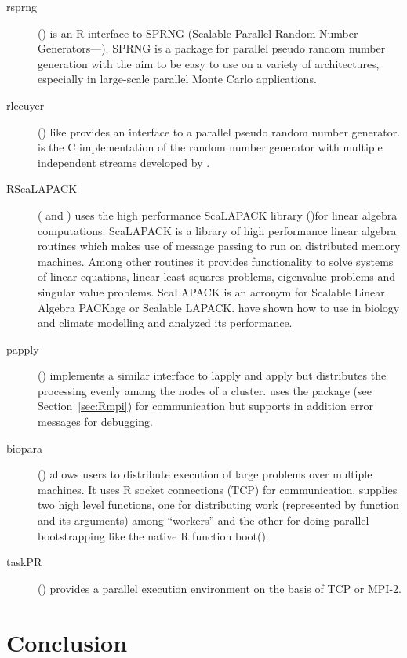 \begin{description}
\item[rsprng] (\cite{li07rsprng}) is an R interface to SPRNG (Scalable
  Parallel Random 
  Number Generators---\cite{mascagni00ssl}). SPRNG is a package for parallel
  pseudo random number generation with the aim to be easy to use on a
  variety of architectures, especially in large-scale parallel Monte
  Carlo applications.
\item[rlecuyer] (\cite{sevcikova05rlecuyer}) like 
  provides an interface to a parallel pseudo random number
  generator.  is the C implementation of the  
  random number generator with multiple independent streams developed
  by \cite{l'ecuyer02RNG}.
\item[RScaLAPACK] (\cite{samatova05RSca} and \cite{yoginath05rhp})
  uses the high performance ScaLAPACK library
  (\cite{dongarra97sus})for linear algebra computations. ScaLAPACK is
  a library of high performance linear algebra routines which makes
  use of message passing to run on distributed memory machines. Among
  other routines it provides functionality to solve systems of linear equations, linear
  least squares problems, eigenvalue problems and singular value
  problems. ScaLAPACK is an acronym for Scalable Linear Algebra
  PACKage or Scalable LAPACK. \cite{samatova06hps} have shown how to
  use  in biology and climate modelling and analyzed
  its performance.
\item[papply] (\cite{currie05papply}) implements a similar interface
  to lapply and apply but distributes the processing evenly among the
  nodes of a cluster.  uses the package  (see
  Section~\ref{sec:Rmpi}) for
  communication but supports in addition error messages for debugging.
\item[biopara] (\cite{lazar06biopara}) allows users to distribute
  execution of large problems over multiple machines. It uses R socket
  connections (TCP) for communication.  supplies two high
  level functions, one for distributing work (represented by function
  and its arguments) among ``workers'' and the other for doing
  parallel bootstrapping like the native R function boot(). 
\item[taskPR] (\cite{samatova04taskPR}) provides a parallel execution
  environment on the basis of TCP or MPI-2.
\end{description}

\section{Conclusion}

